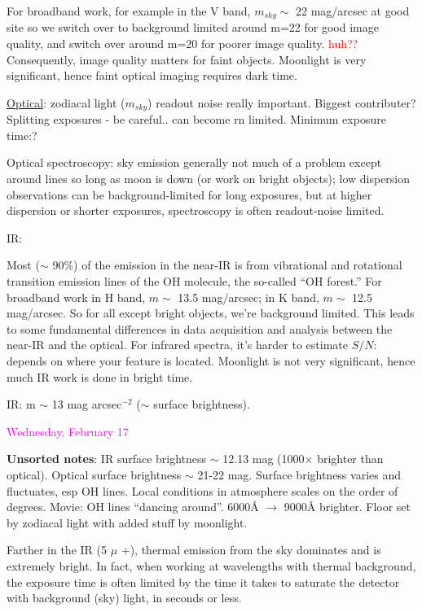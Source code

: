 \documentclass[12pt]{article}
\begin{document}
For broadband work, for example in the V band, $m_{sky}\sim$ 22
mag/arcsec at good site so we switch over to background limited around
m=22 for good image quality, and switch over around m=20 for poorer image
quality. \textcolor{red}{huh??}
Consequently, image quality matters for faint objects.
Moonlight is very significant, hence faint optical imaging requires
dark time.

\textcolor{myBlue}{\underline{Optical}:
zodiacal light ($m_{sky}$) readout noise really
important. Biggest contributer? Splitting exposures - be careful.. can
become rn limited. Minimum exposure time:?}

Optical spectroscopy: sky emission generally not much of a problem
except around lines so long as moon is down (or work on bright
objects); low dispersion observations can be background-limited for
long exposures, but at higher dispersion or shorter exposures,
spectroscopy is often readout-noise limited.

IR:

Most ($\sim$ 90\%) of the emission in the near-IR is from
vibrational and rotational transition
emission lines of the OH molecule, the
so-called ``OH forest.'' For broadband work in H band, $m\sim$ 13.5
mag/arcsec; in K band, $m\sim$ 12.5 mag/arcsec. So for all except
bright objects, we're background limited. This leads to some
fundamental differences in data acquisition and analysis between the
near-IR and the optical. For infrared spectra, it's harder to estimate
$S/N$: depends on where your feature is located. Moonlight is not very
significant, hence much IR work is done in bright time.

\textcolor{myBlue} IR: m $\sim$ 13 mag arcsec$^{-2}$ ($\sim$ surface
brightness).

\textcolor{magenta}{Wednesday, February 17}

\textcolor{myBlue}{\textbf{Unsorted notes}: IR surface brightness
    $\sim$ 12.13 mag (1000$\times$ brighter than optical).
    Optical surface brightness $\sim$ 21-22 mag.
    Surface brightness varies and fluctuates, esp OH lines.
    Local conditions in atmosphere scales on the order of degrees.
    Movie: OH lines ``dancing around''.
    6000\AA{} $\rightarrow$ 9000\AA{} brighter. Floor set by zodiacal
    light with added stuff by moonlight.
}

Farther in the IR (5 $\mu$ +), thermal emission from the sky dominates
and is extremely bright. In fact, when working at wavelengths with thermal
background, the exposure time is often limited by the time it takes to
saturate the detector with background (sky) light, in seconds or less.
\end{document}
